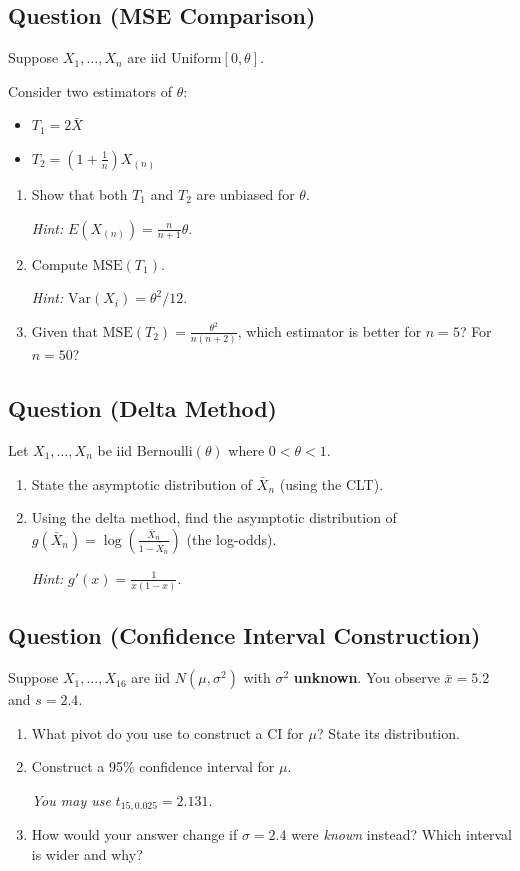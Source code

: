 \documentclass[11pt]{article}
\newcounter{qnum}
\newcommand{\question}[1]{\stepcounter{qnum}\subsection*{Question \theqnum \quad (#1)}}
\begin{document}
\vspace{3in}

\question{MSE Comparison}
Suppose $X_1, \ldots, X_n$ are iid $\text{Uniform}[0, \theta]$.

Consider two estimators of $\theta$:
\begin{itemize}
\item $T_1 = 2\bar X$
\item $T_2 = \left(1 + \frac{1}{n}\right) X_{(n)}$
\end{itemize}

\begin{enumerate}[label=(\alph*)]
\item Show that both $T_1$ and $T_2$ are unbiased for $\theta$.

\textit{Hint:} $E(X_{(n)}) = \frac{n}{n+1}\theta$.

\item Compute $\text{MSE}(T_1)$.

\textit{Hint:} $\text{Var}(X_i) = \theta^2/12$.

\item Given that $\text{MSE}(T_2) = \frac{\theta^2}{n(n+2)}$, which estimator is better for $n = 5$? For $n = 50$?
\end{enumerate}

\vspace{3in}

\question{Delta Method}
Let $X_1, \ldots, X_n$ be iid $\text{Bernoulli}(\theta)$ where $0 < \theta < 1$.

\begin{enumerate}[label=(\alph*)]
\item State the asymptotic distribution of $\bar X_n$ (using the CLT).
\item Using the delta method, find the asymptotic distribution of $g(\bar X_n) = \log\!\left(\frac{\bar X_n}{1 - \bar X_n}\right)$ (the log-odds).

\textit{Hint:} $g'(x) = \frac{1}{x(1-x)}$.
\end{enumerate}

\vspace{3in}

\question{Confidence Interval Construction}
Suppose $X_1, \ldots, X_{16}$ are iid $N(\mu, \sigma^2)$ with $\sigma^2$ \textbf{unknown}. You observe $\bar x = 5.2$ and $s = 2.4$.

\begin{enumerate}[label=(\alph*)]
\item What pivot do you use to construct a CI for $\mu$? State its distribution.
\item Construct a 95\% confidence interval for $\mu$.

\textit{You may use} $t_{15, 0.025} = 2.131$.

\item How would your answer change if $\sigma = 2.4$ were \emph{known} instead? Which interval is wider and why?
\end{enumerate}
\end{document}
